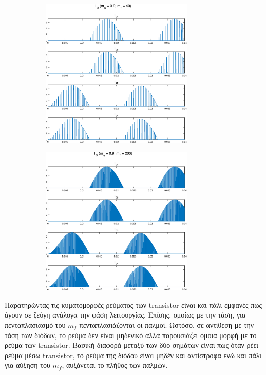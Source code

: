 \begin{figure}[h]
	\begin{subfigure}{0.49\textwidth}
		\centering
		\includegraphics[width=0.8\textwidth]{Images/I_D_40}
	\end{subfigure}
	\begin{subfigure}{0.49\textwidth}
		\centering
		\includegraphics[width=0.8\textwidth]{Images/I_D_200}
	\end{subfigure}
\end{figure}
\noindent
Παρατηρώντας τις κυματομορφές ρεύματος των transistor είναι και πάλι εμφανές πως άγουν σε ζεύγη ανάλογα την φάση λειτουργίας. Επίσης, ομοίως με την τάση, για πενταπλασιασμό του $m_f$ πενταπλασιάζονται οι παλμοί. Ωστόσο, σε αντίθεση με την τάση των διόδων, το ρεύμα δεν είναι μηδενικό αλλά παρουσιάζει όμοια μορφή με το ρεύμα των transistor. Βασική διαφορά μεταξύ των δύο σημάτων είναι πως όταν ρέει ρεύμα μέσω transistor, το ρεύμα της διόδου είναι μηδέν και αντίστροφα ενώ και πάλι για αύξηση του $m_f$, αυξάνεται το πλήθος των παλμών.

